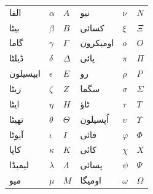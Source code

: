 \documentclass[../../../include/open-logic-chapter]{subfiles}
\begin{document}

\begin{center}
    \begin{tabular}{lll@{\qquad}lll}
    الفا &	$\alpha$ & $A$ &
    نیو & $\nu$ & $N$ \\
    بیٹا & $\beta$ & $B$ &
    کسائی & $\xi$ & $\Xi$ \\
    گاما &	$\gamma$ & $\Gamma$ &
    اومیکرون & $o$ & $O$ \\
    ڈیلٹا & $\delta$ & $\Delta$ &
    پائی & $\pi$ & $\Pi$ \\
    ایپسیلون & $\epsilon$ & $E$ &
    رو & $\rho$ & $P$ \\
    زیٹا & $\zeta$ & $Z$ &
    سگما &	$\sigma$ & $\Sigma$ \\
    ایٹا & $\eta$ & $H$ &
    ٹاؤ & $\tau$ & $T$ \\
    تھیٹا & $\theta$ & $\Theta$ &
    اُپسیلون & $\upsilon$ & $\Upsilon$ \\
    آیوٹا & $\iota$ & $I$ &
    فائی & $\varphi$ & $\Phi$ \\
    کاپا & $\kappa$ & $K$ &
    کائی & $\chi$ & $X$ \\
    لیمبڈا & $\lambda$ & $\Lambda$ &
    پسائی & $\psi$ & $\Psi$ \\
    میو & $\mu$ & $M$ &
    اومیگا & $\omega$ & $\Omega$
    \end{tabular}
\end{center}
\end{document}
